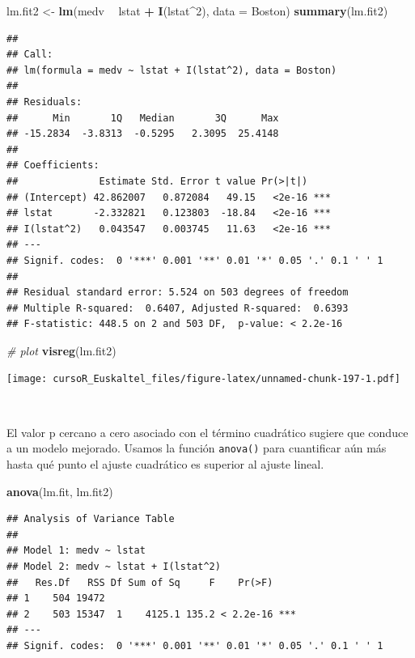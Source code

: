 \documentclass[]{book}
\newenvironment{Shaded}{\begin{snugshade}}{\end{snugshade}}
\newcommand{\KeywordTok}[1]{\textcolor[rgb]{0.13,0.29,0.53}{\textbf{#1}}}
\newcommand{\DataTypeTok}[1]{\textcolor[rgb]{0.13,0.29,0.53}{#1}}
\newcommand{\DecValTok}[1]{\textcolor[rgb]{0.00,0.00,0.81}{#1}}
\newcommand{\StringTok}[1]{\textcolor[rgb]{0.31,0.60,0.02}{#1}}
\newcommand{\CommentTok}[1]{\textcolor[rgb]{0.56,0.35,0.01}{\textit{#1}}}
\newcommand{\OperatorTok}[1]{\textcolor[rgb]{0.81,0.36,0.00}{\textbf{#1}}}
\newcommand{\NormalTok}[1]{#1}
\begin{document}
\begin{Shaded}
\begin{Highlighting}[]
\NormalTok{lm.fit2 <-}\StringTok{ }\KeywordTok{lm}\NormalTok{(medv }\OperatorTok{~}\StringTok{ }\NormalTok{lstat }\OperatorTok{+}\StringTok{ }\KeywordTok{I}\NormalTok{(lstat}\OperatorTok{^}\DecValTok{2}\NormalTok{), }\DataTypeTok{data =}\NormalTok{ Boston)}
\KeywordTok{summary}\NormalTok{(lm.fit2)}
\end{Highlighting}
\end{Shaded}

\begin{verbatim}
## 
## Call:
## lm(formula = medv ~ lstat + I(lstat^2), data = Boston)
## 
## Residuals:
##      Min       1Q   Median       3Q      Max 
## -15.2834  -3.8313  -0.5295   2.3095  25.4148 
## 
## Coefficients:
##              Estimate Std. Error t value Pr(>|t|)    
## (Intercept) 42.862007   0.872084   49.15   <2e-16 ***
## lstat       -2.332821   0.123803  -18.84   <2e-16 ***
## I(lstat^2)   0.043547   0.003745   11.63   <2e-16 ***
## ---
## Signif. codes:  0 '***' 0.001 '**' 0.01 '*' 0.05 '.' 0.1 ' ' 1
## 
## Residual standard error: 5.524 on 503 degrees of freedom
## Multiple R-squared:  0.6407, Adjusted R-squared:  0.6393 
## F-statistic: 448.5 on 2 and 503 DF,  p-value: < 2.2e-16
\end{verbatim}

\begin{Shaded}
\begin{Highlighting}[]
\CommentTok{# plot}
\KeywordTok{visreg}\NormalTok{(lm.fit2)}
\end{Highlighting}
\end{Shaded}

\texttt{[image: cursoR\_Euskaltel\_files/figure-latex/unnamed-chunk-197-1.pdf]}

~

El valor p cercano a cero asociado con el término cuadrático sugiere que
conduce a un modelo mejorado. Usamos la función \texttt{anova()} para
cuantificar aún más hasta qué punto el ajuste cuadrático es superior al
ajuste lineal.

\begin{Shaded}
\begin{Highlighting}[]
\KeywordTok{anova}\NormalTok{(lm.fit, lm.fit2)}
\end{Highlighting}
\end{Shaded}

\begin{verbatim}
## Analysis of Variance Table
## 
## Model 1: medv ~ lstat
## Model 2: medv ~ lstat + I(lstat^2)
##   Res.Df   RSS Df Sum of Sq     F    Pr(>F)    
## 1    504 19472                                 
## 2    503 15347  1    4125.1 135.2 < 2.2e-16 ***
## ---
## Signif. codes:  0 '***' 0.001 '**' 0.01 '*' 0.05 '.' 0.1 ' ' 1
\end{verbatim}
\end{document}

